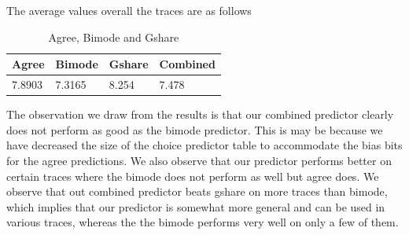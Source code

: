 \documentclass{sig-alternate}
\begin{document}
The average values overall the traces are as follows
\begin{table}[h]

\caption{Agree\cite{agreepaper}, Bimode\cite{bimodepaper} and Gshare\cite{gsharepaper}}
\centering
\begin{tabular}{llll}
\hline
Agree & Bimode & Gshare & Combined \\
\hline
7.8903 & 7.3165 & 8.254 & 7.478 \\
\hline
\end{tabular}
\end{table}

The observation we draw from the results is that our combined predictor clearly does not perform as good as the bimode predictor. This is may be because we have decreased the size of the choice predictor table to accommodate the bias bits for the agree predictions. We also observe that our predictor performs better on certain traces where the bimode does not perform as well but agree does. We observe that out combined predictor beats gshare on more traces than bimode, which implies that our predictor is somewhat more general and can be used in various traces, whereas the the bimode performs very well on only a few of them.




\end{document}
